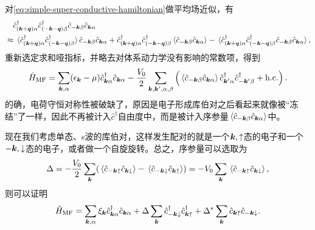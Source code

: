 \documentclass[hyperref, UTF8, a4paper]{ctexart}
\begin{document}
对\eqref{eq:simple-super-conductive-hamiltonian}做平均场近似，有
\[
    \begin{aligned}
        & \quad \hat{c}^\dagger_{(\vb*{k} + \vb*{q}) \alpha} \hat{c}^\dagger_{( - \vb*{k} - \vb*{q}) \beta} \hat{c}_{-\vb*{k} \beta} \hat{c}_{\vb*{k} \alpha} \\
        &\approx \expval*{\hat{c}^\dagger_{(\vb*{k} + \vb*{q}) \alpha} \hat{c}^\dagger_{( - \vb*{k} - \vb*{q}) \beta}} \hat{c}_{-\vb*{k} \beta} \hat{c}_{\vb*{k} \alpha} + \hat{c}^\dagger_{(\vb*{k} + \vb*{q}) \alpha} \hat{c}^\dagger_{( - \vb*{k} - \vb*{q}) \beta} \expval*{\hat{c}_{-\vb*{k} \beta} \hat{c}_{\vb*{k} \alpha}} - \expval*{\hat{c}^\dagger_{(\vb*{k} + \vb*{q}) \alpha} \hat{c}^\dagger_{( - \vb*{k} - \vb*{q}) \beta} \hat{c}_{-\vb*{k} \beta} \hat{c}_{\vb*{k} \alpha}},
    \end{aligned}
\]
重新选定求和哑指标，并略去对体系动力学没有影响的常数项，得到
\begin{equation}
    \hat{H}_\text{MF} = \sum_{\vb*{k}, \alpha} (\epsilon_{\vb*{k}} - \mu) \hat{c}_{\vb*{k} \alpha}^\dagger \hat{c}_{\vb*{k} \alpha} - \frac{V_0}{2} \sum_{\vb*{k}, \vb*{k}', \alpha, \beta} \left(
        \expval*{\hat{c}_{-\vb*{k} \beta} \hat{c}_{\vb*{k} \alpha}} \hat{c}^\dagger_{\vb*{k}' \alpha} \hat{c}^\dagger_{- \vb*{k}' \beta} + \text{h.c.} 
    \right).
\end{equation}
的确，电荷守恒对称性被破缺了，原因是电子形成库伯对之后看起来就像被“冻结”了一样，因此不再被计入$\hat{c}^\dagger$自由度中，而是被计入序参量$\expval*{\hat{c}_{-\vb*{k} \beta} \hat{c}_{\vb*{k} \alpha}}$中。

现在我们考虑单态、s波的库伯对，这样发生配对的就是一个$\vb*{k}, \uparrow$态的电子和一个$-\vb*{k}, \downarrow$态的电子，或者做一个自旋旋转。总之，序参量可以选取为
\begin{equation}
    \Delta = - \frac{V_0}{2} \sum_{\vb*{k}} (
        \expval*{\hat{c}_{-\vb*{k}\uparrow} \hat{c}_{\vb*{k} \downarrow}} - \expval*{\hat{c}_{-\vb*{k} \downarrow} \hat{c}_{\vb*{k} \uparrow}}
    ) = -V_0 \sum_{\vb*{k}} \expval*{\hat{c}_{-\vb*{k}\uparrow} \hat{c}_{\vb*{k} \downarrow}} ,
    \label{eq:superconductive-order-parameter}
\end{equation}
则可以证明
\begin{equation}
    \hat{H}_\text{MF} = \sum_{\vb*{k}, \alpha} \xi_{\vb*{k}} \hat{c}_{\vb*{k} \alpha}^\dagger \hat{c}_{\vb*{k} \alpha} 
    + \Delta \sum_{\vb*{k}} \hat{c}_{-\vb*{k} \downarrow}^\dagger \hat{c}^\dagger_{\vb*{k} \uparrow}
    + \Delta^* \sum_{\vb*{k}} \hat{c}_{\vb*{k} \uparrow} \hat{c}_{-\vb*{k} \downarrow}.
    \label{eq:s-wave-superconductive-hamiltonian}
\end{equation}
\end{document}
